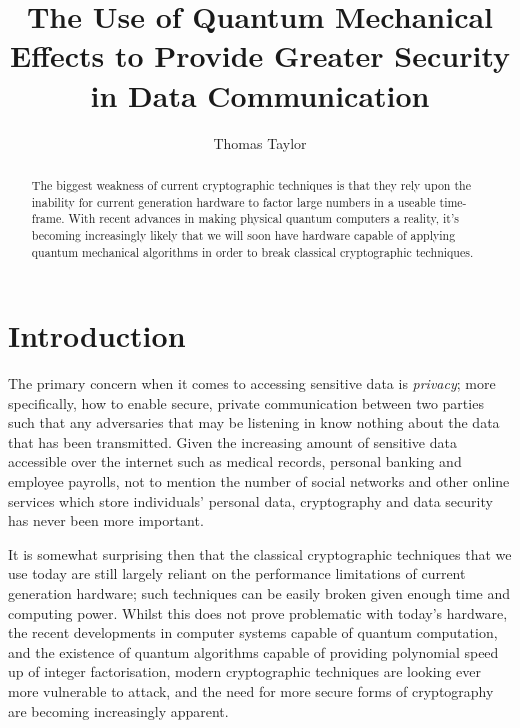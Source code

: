 \documentclass[runningheads,a4paper]{llncs}
\begin{document}
\mainmatter  

\title{The Use of Quantum Mechanical Effects to Provide Greater Security in Data Communication}
\author{Thomas Taylor\\ \mail}

\maketitle

\begin{abstract}
The biggest weakness of current cryptographic techniques is that they rely upon the inability for current generation hardware to factor large numbers in a useable time-frame. With recent advances in making physical quantum computers a reality, it's becoming increasingly likely that we will soon have hardware capable of applying quantum mechanical algorithms in order to break classical cryptographic techniques.
\end{abstract}

\section{Introduction}

The primary concern when it comes to accessing sensitive data is \emph{privacy}; more specifically, how to enable secure, private communication between two parties such that any adversaries that may be listening in know nothing about the data that has been transmitted\cite{Rivest:1990fk}. Given the increasing amount of sensitive data accessible over the internet such as medical records, personal banking and employee payrolls, not to mention the number of social networks and other online services which store individuals' personal data, cryptography and data security has never been more important.

It is somewhat surprising then that the classical cryptographic techniques that we use today are still largely reliant on the performance limitations of current generation hardware; such techniques can be easily broken given enough time and computing power. Whilst this does not prove problematic with today's hardware, the recent developments in computer systems capable of quantum computation, and the existence of quantum algorithms capable of providing polynomial speed up of integer factorisation\cite{Shor:1994fk}, modern cryptographic techniques are looking ever more vulnerable to attack, and the need for more secure forms of cryptography are becoming increasingly apparent.
\end{document}
